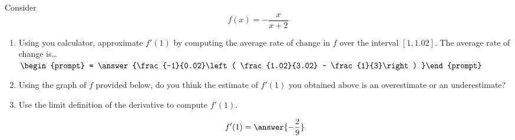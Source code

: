 \documentclass{ximera}
\author{Steven Gubkin}
\begin{document}
\begin{exercise}



Consider 
\[
f(x) = -\frac{x}{x+2}
\]



\begin{enumerate}
\item Using you calculator, approximate $f'(1)$ by computing the average rate of change in $f$ over the interval $[1,1.02]$.  The average rate of change is\dots  $\begin{prompt} = \answer{\frac{-1}{0.02}\left( \frac{1.02}{3.02} - \frac{1}{3}\right) }\end{prompt}$
\item Using the graph of $f$ provided below, do you think the estimate of $f'(1)$ you obtained above is an overestimate or an underestimate?

\begin{prompt}
\begin{multipleChoice}
\end{multipleChoice}
\end{prompt}

\begin{image}
\end{image}

\item Use the limit definition of the derivative to compute $f'(1)$.  \begin{prompt} $$f'(1) = \answer{-\frac{2}{9}}$$\end{prompt}
\end{enumerate}
\end{exercise}
\end{document}
